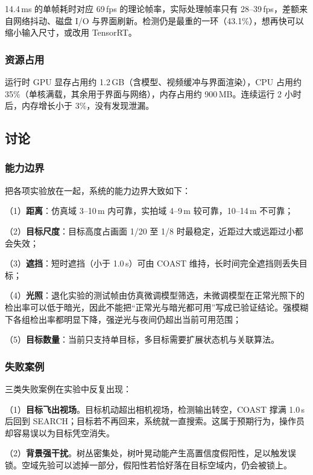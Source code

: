 14.4\,ms 的单帧耗时对应 69\,fps 的理论帧率，实际处理帧率只有 28--39\,fps，差额来自网络抖动、磁盘 I/O 与界面刷新。检测仍是最重的一环（43.1\%），想再快可以缩小输入尺寸，或改用 TensorRT。

\subsubsection{资源占用}

运行时 GPU 显存占用约 1.2\,GB（含模型、视频缓冲与界面渲染），CPU 占用约 35\%（单核满载，其余用于界面与网络），内存占用约 900\,MB。连续运行 2 小时后，内存增长小于 3\%，没有发现泄漏。

\subsection{讨论}

\subsubsection{能力边界}

把各项实验放在一起，系统的能力边界大致如下：

（1）\textbf{距离}：仿真域 3--10\,m 内可靠，实拍域 4--9\,m 较可靠，10--14\,m 不可靠；

（2）\textbf{目标尺度}：目标高度占画面 1/20 至 1/8 时最稳定，近距过大或远距过小都会失效；

（3）\textbf{遮挡}：短时遮挡（小于 1.0\,s）可由 COAST 维持，长时间完全遮挡则丢失目标；

（4）\textbf{光照}：退化实验的测试帧由仿真微调模型筛选，未微调模型在正常光照下的检出率可以低于暗光，因此不能把“正常光与暗光都可用”写成已验证结论。强模糊下各组检出率都明显下降，强逆光与夜间仍超出当前可用范围；

（5）\textbf{目标数量}：当前只支持单目标，多目标需要扩展状态机与关联算法。

\subsubsection{失败案例}

三类失败案例在实验中反复出现：

（1）\textbf{目标飞出视场}。目标机动超出相机视场，检测输出转空，COAST 撑满 1.0\,s 后回到 SEARCH；目标若不再回来，系统就一直搜索。这属于预期行为，操作员却容易误以为目标凭空消失。

（2）\textbf{背景强干扰}。树丛密集处，树叶晃动能产生高置信度假阳性，足以触发误锁。空域先验可以滤掉一部分，假阳性若恰好落在目标空域内，仍会被锁上。

